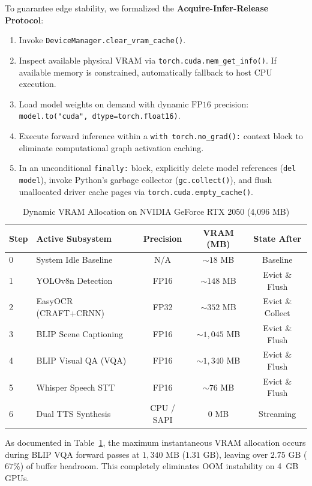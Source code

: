 \documentclass[conference]{IEEEtran}
\begin{document}
To guarantee edge stability, we formalized the \textbf{Acquire-Infer-Release Protocol}:
\begin{enumerate}
    \item Invoke \texttt{DeviceManager.clear\_vram\_cache()}.
    \item Inspect available physical VRAM via \texttt{torch.cuda.mem\_get\_info()}. If available memory is constrained, automatically fallback to host CPU execution.
    \item Load model weights on demand with dynamic $\text{FP16}$ precision: \texttt{model.to("cuda", dtype=torch.float16)}.
    \item Execute forward inference within a \texttt{with torch.no\_grad():} context block to eliminate computational graph activation caching.
    \item In an unconditional \texttt{finally:} block, explicitly delete model references (\texttt{del model}), invoke Python's garbage collector (\texttt{gc.collect()}), and flush unallocated driver cache pages via \texttt{torch.cuda.empty\_cache()}.
\end{enumerate}

\begin{table}[htbp]
\caption{Dynamic VRAM Allocation on NVIDIA GeForce RTX 2050 (4,096 MB)}
\begin{center}
\begin{tabular}{llccc}
\toprule
\textbf{Step} & \textbf{Active Subsystem} & \textbf{Precision} & \textbf{VRAM (MB)} & \textbf{State After} \\
\midrule
0 & System Idle Baseline & N/A & $\sim 18$ MB & Baseline \\
1 & YOLOv8n Detection & FP16 & $\sim 148$ MB & Evict \& Flush \\
2 & EasyOCR (CRAFT+CRNN) & FP32 & $\sim 352$ MB & Evict \& Collect \\
3 & BLIP Scene Captioning & FP16 & $\sim 1,045$ MB & Evict \& Flush \\
4 & BLIP Visual QA (VQA) & FP16 & $\sim 1,340$ MB & Evict \& Flush \\
5 & Whisper Speech STT & FP16 & $\sim 76$ MB & Evict \& Flush \\
6 & Dual TTS Synthesis & CPU / SAPI & 0 MB & Streaming \\
\bottomrule
\end{tabular}
\label{tab:vram}
\end{center}
\end{table}

As documented in Table~\ref{tab:vram}, the maximum instantaneous VRAM allocation occurs during BLIP VQA forward passes at $1,340\text{ MB}$ ($1.31\text{ GB}$), leaving over $2.75\text{ GB}$ ($67\%$) of buffer headroom. This completely eliminates OOM instability on 4~GB GPUs.
\end{document}

